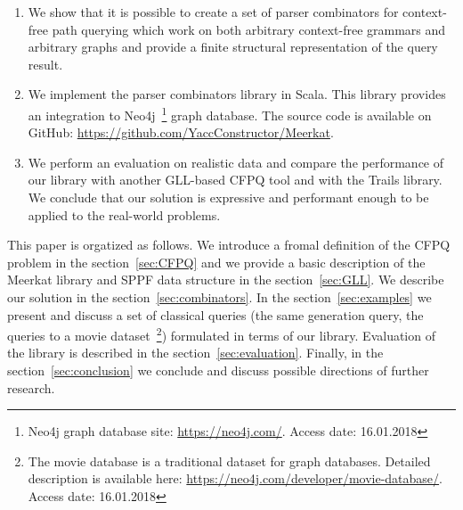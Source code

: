 \begin{enumerate}
\item We show that it is possible to create a set of parser combinators for context-free path querying which work on both arbitrary context-free grammars and arbitrary graphs and provide a finite structural representation of the query result.
\item We implement the parser combinators library in Scala. This library provides an integration to Neo4j~\footnote{Neo4j graph database site: \url{https://neo4j.com/}. Access date: 16.01.2018} graph database. The source code is available on GitHub: \url{https://github.com/YaccConstructor/Meerkat}.
\item We perform an evaluation on realistic data and compare the performance of our library with another GLL-based CFPQ tool and with the Trails library.
We conclude that our solution is expressive and performant enough to be applied to the real-world problems.
\end{enumerate}


This paper is orgatized as follows.
We introduce a fromal definition of the CFPQ problem in the section~\ref{sec:CFPQ} and we provide a basic description of the Meerkat library and SPPF data structure in the section~\ref{sec:GLL}.
We describe our solution in the section~\ref{sec:combinators}.
In the section~\ref{sec:examples} we present and discuss a set of classical queries (the same generation query, the queries to a movie dataset~\footnote{The movie database is a traditional dataset for graph databases. Detailed description is available here: \url{https://neo4j.com/developer/movie-database/}. Access date: 16.01.2018}) 
formulated in terms of our library.
Evaluation of the library is described in the section~\ref{sec:evaluation}.
Finally, in the section~\ref{sec:conclusion} we conclude and discuss possible directions of further research.
